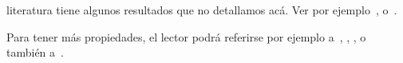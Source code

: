 \begin{itemize}
  literatura  tiene  algunos  resultados   que  no  detallamos  ac\'a.  Ver  por
  ejemplo~\cite{GupVar95}, o~\cite[Teo.~10-12]{DiaGut11}.
%
%
%
%
\end{itemize}

Para  tener   m\'as  propiedades,  el  lector  podr\'a   referirse  por  ejemplo
a~\cite{FanChe84},  \cite[\S~9.2 \&~9.3]{GupNag99},  \cite[\S~13.2]{BilBre99}, o
tambi\'en a~\cite{And03, Daw78, Daw81, LibrosABuscar}.


